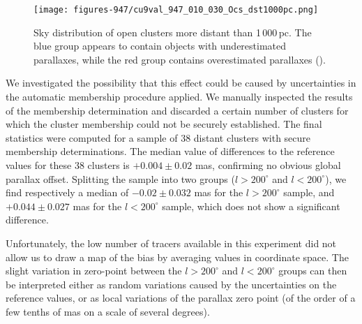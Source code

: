 \begin{figure}
 \begin{center}
\texttt{[image: figures-947/cu9val\_947\_010\_030\_Ocs\_dst1000pc.png]}
\end{center}
\caption{Sky distribution of open clusters more distant than 1\,000\,pc. The blue group appears to contain objects with underestimated parallaxes, while the red group contains overestimated parallaxes ().}\label{fig:WP947_VAL_010_030_Ocs_dst1000pc}
\end{figure}


We investigated the possibility that this effect could be caused by uncertainties in the automatic membership procedure applied. We manually inspected the results of the membership determination and discarded a certain number of clusters for which the cluster membership could not be securely established. The final statistics were computed for a sample of 38 distant clusters with secure membership determinations.
The median value of differences to the reference values for these 38 clusters is $+0.004\pm 0.02$ mas, confirming no obvious global parallax offset. Splitting the sample into two groups ($l>200^{\circ}$ and $l<200^{\circ}$), we find respectively a median of $-0.02\pm 0.032$ mas for the $l>200^{\circ}$ sample, and $+0.044\pm0.027$ mas for the $l<200^{\circ}$ sample, which does not show a significant difference. 

Unfortunately, the low number of tracers available in this experiment did not allow us to draw a map of the bias by averaging values in coordinate space. The slight variation in zero-point between the $l>200^{\circ}$ and $l<200^{\circ}$ groups can then be interpreted either as random variations caused by the uncertainties on the reference values, or as local variations of the parallax zero point (of the order of a few tenths of mas on a scale of several degrees).


